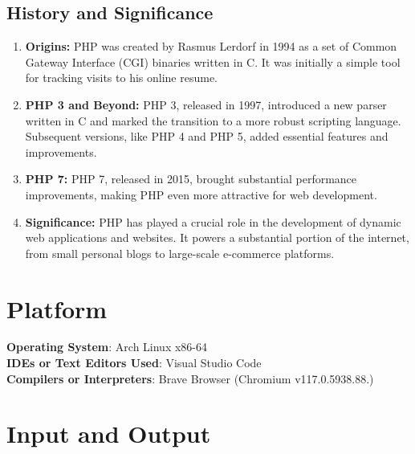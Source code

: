 \documentclass[11pt]{article}
\begin{document}
\subsection{History and Significance}
\begin{enumerate}
    \item \textbf{Origins:} PHP was created by Rasmus Lerdorf in 1994 as a set of Common Gateway Interface (CGI) binaries written in C. It was initially a simple tool for tracking visits to his online resume.
    \item \textbf{PHP 3 and Beyond:} PHP 3, released in 1997, introduced a new parser written in C and marked the transition to a more robust scripting language. Subsequent versions, like PHP 4 and PHP 5, added essential features and improvements.
    \item \textbf{PHP 7:} PHP 7, released in 2015, brought substantial performance improvements, making PHP even more attractive for web development.
    \item \textbf{Significance:} PHP has played a crucial role in the development of dynamic web applications and websites. It powers a substantial portion of the internet, from small personal blogs to large-scale e-commerce platforms.
\end{enumerate}


\section{Platform}
\textbf{Operating System}: Arch Linux x86-64 \\
\textbf{IDEs or Text Editors Used}: Visual Studio Code\\
\textbf{Compilers or Interpreters}: Brave Browser (Chromium v117.0.5938.88.) \\

\section{Input and Output}
\end{document}
